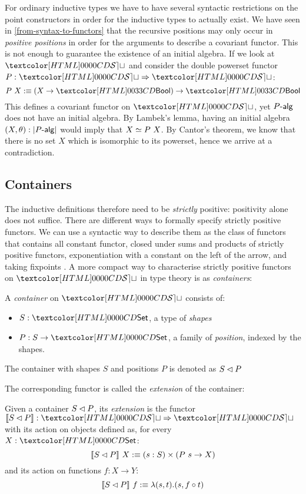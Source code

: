 For ordinary inductive types we have to have several syntactic
restrictions on the point constructors in order for the inductive
types to actually exist. We have seen in
\cref{from-syntax-to-functors} that the recursive positions may only
occur in \emph{positive positions} in order for the arguments to
describe a covariant functor. This is not enough to guarantee the
existence of an initial algebra. If we look at $\SET$ and consider the
double powerset functor $P : \Func{\SET}{\SET}$:
$$
P\ X \ddefeq (X \to \boolty) \to \boolty
$$
This defines a covariant functor on $\SET$, yet $\algcat{P}$ does not
have an initial algebra. By Lambek's lemma, having an initial algebra
$(X,\theta) : | \algcat{P} |$ would imply that $X \simeq P\ X$. By
Cantor's theorem, we know that there is no set $X$ which is isomorphic
to its powerset, hence we arrive at a contradiction.

\subsection{Containers}
The inductive definitions therefore need to be \emph{strictly}
positive: positivity alone does not suffice. There are different ways
to formally specify strictly positive functors. We can use a syntactic
way to describe them as the class of functors that contains all
constant functor, closed under sums and products of strictly positive
functors, exponentiation with a constant on the left of the arrow, and
taking fixpoints \cite{Morris2007}. A more compact way to characterise
strictly positive functors on $\SET$ in type theory is as
\emph{containers}:
%
\begin{definition}
\label{def-container}
  A \emph{container} on $\SET$ consists of:
  \begin{itemize}
  \item $S : \Set$, a type of \emph{shapes}
  \item $P : S \to \Set$, a family of \emph{position}, indexed by the shapes.
  \end{itemize}
  The container with shapes $S$ and positions $P$ is denoted as
  $S \lhd P$
\end{definition}
%
The corresponding functor is called the \emph{extension} of the container:
%
\begin{definition}
  Given a container $S \lhd P$, its \emph{extension} is the functor
  $\context{\cont{S}{P}} : \Func{\SET}{\SET}$ with its action on objects
  defined as, for every $X : \Set$:
  $$
  \llbracket S \lhd P \rrbracket\ X :\equiv (s : S) \times (P\ s \to X)
  $$
  and its action on functions $f : X \to Y$:
  $$
  \llbracket S \lhd P \rrbracket\ f :\equiv \lambda (s , t) . (s , f \circ t)
  $$
\end{definition}

